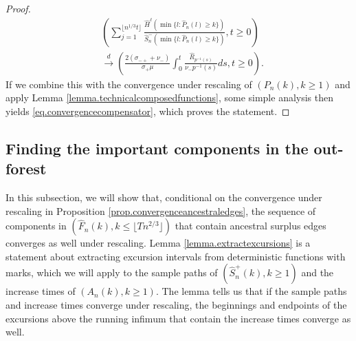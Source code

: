 \begin{proof}
\begin{align*}&\left(\sum_{j=1}^{\lfloor n^{1/3}t\rfloor}\frac{\hat{H}^\ell(\min\{l:\hat{P}_n(l)\geq k\})}{\hat{S}^-_n(\min\{l:\hat{P}_n(l)\geq k\})},t\geq 0\right)\\
&\overset{d}{\to} \left( \frac{2(\sigma_{-+}+\nu_-)}{\sigma_+\mu} \int_0^t \frac{\hat{R}_{p^{-1}(s)}}{\nu_- p^{-1}(s)}ds,t\geq 0 \right).
\end{align*}
If we combine this with the convergence under rescaling of $(P_n(k),k\geq 1)$ and apply Lemma \ref{lemma.technicalcomposedfunctions}, some simple analysis then yields \eqref{eq.convergencecompensator}, which proves the statement.
\end{proof}

\subsection{Finding the important components in the out-forest}\label{subsec.componentswithancestral}
In this subsection, we will show that, conditional on the convergence under rescaling in Proposition \ref{prop.convergenceancestraledges}, the sequence of components in $(\hat{F}_n(k),k\leq \lfloor T n^{2/3}\rfloor )$ that contain ancestral surplus edges converges as well under rescaling. Lemma \ref{lemma.extractexcursions} is a statement about extracting excursion intervals from deterministic functions with marks, which we will apply to the sample paths of $(\hat{S}_n^{+}(k),k\geq 1)$ and the increase times of $(A_n(k),k\geq 1)$. The lemma tells us that if the sample paths and increase times converge under rescaling, the beginnings and endpoints of the excursions above the running infimum that contain the increase times converge as well. 
